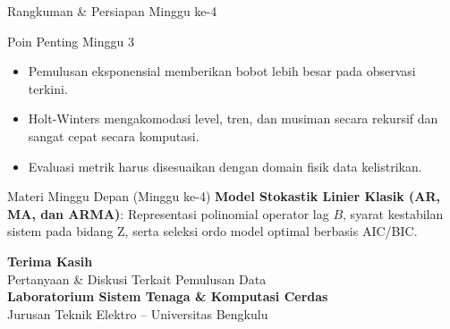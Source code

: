 \documentclass[aspectratio=169, 10pt]{beamer}
\begin{document}
\begin{frame}{Rangkuman \& Persiapan Minggu ke-4}
    \begin{block}{Poin Penting Minggu 3}
        \begin{itemize}
            \item Pemulusan eksponensial memberikan bobot lebih besar pada observasi terkini.
            \item Holt-Winters mengakomodasi level, tren, dan musiman secara rekursif dan sangat cepat secara komputasi.
            \item Evaluasi metrik harus disesuaikan dengan domain fisik data kelistrikan.
        \end{itemize}
    \end{block}
    \vspace{0.2cm}
    \begin{alertblock}{Materi Minggu Depan (Minggu ke-4)}
        \textbf{Model Stokastik Linier Klasik (AR, MA, dan ARMA)}: Representasi polinomial operator lag $B$, syarat kestabilan sistem pada bidang Z, serta seleksi ordo model optimal berbasis AIC/BIC.
    \end{alertblock}
\end{frame}

\begin{frame}[plain]
    \begin{center}
        \vspace{1.5cm}
        {\Huge \color{mainblue} \textbf{Terima Kasih}}\\[0.4cm]
        {\large Pertanyaan \& Diskusi Terkait Pemulusan Data}\\[1.2cm]
        \textbf{Laboratorium Sistem Tenaga \& Komputasi Cerdas}\\
        Jurusan Teknik Elektro -- Universitas Bengkulu
    \end{center}
\end{frame}
\end{document}
